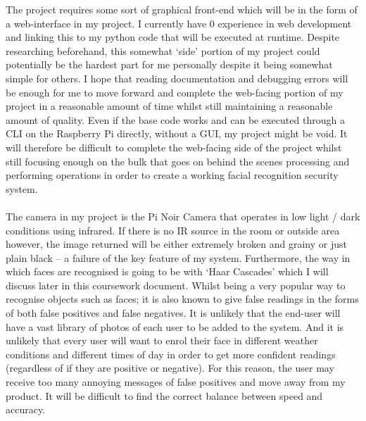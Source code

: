 \documentclass[9pt]{article}
\begin{document}
The project requires some sort of graphical front-end which will be in the form of a web-interface in my project. I currently have 0 experience in web development and linking this to my python code that will be executed at runtime. Despite researching beforehand, this somewhat ‘side’ portion of my project could potentially be the hardest part for me personally despite it being somewhat simple for others. I hope that reading documentation and debugging errors will be enough for me to move forward and complete the web-facing portion of my project in a reasonable amount of time whilst still maintaining a reasonable amount of quality. Even if the base code works and can be executed through a CLI on the Raspberry Pi directly, without a GUI, my project might be void. It will therefore be difficult to complete the web-facing side of the project whilst still focusing enough on the bulk that goes on behind the scenes processing and performing operations in order to create a working facial recognition security system.\\\\
The camera in my project is the Pi Noir Camera that operates in low light / dark conditions using infrared. If there is no IR source in the room or outside area however, the image returned will be either extremely broken and grainy or just plain black – a failure of the key feature of my system. Furthermore, the way in which faces are recognised is going to be with ‘Haar Cascades’ which I will discuss later in this coursework document. Whilst being a very popular way to recognise objects such as faces; it is also known to give false readings in the forms of both false positives and false negatives. It is unlikely that the end-user will have a vast library of photos of each user to be added to the system. And it is unlikely that every user will want to enrol their face in different weather conditions and different times of day in order to get more confident readings (regardless of if they are positive or negative). For this reason, the user may receive too many annoying messages of false positives and move away from my product. It will be difficult to find the correct balance between speed and accuracy.\\\\
\end{document}
